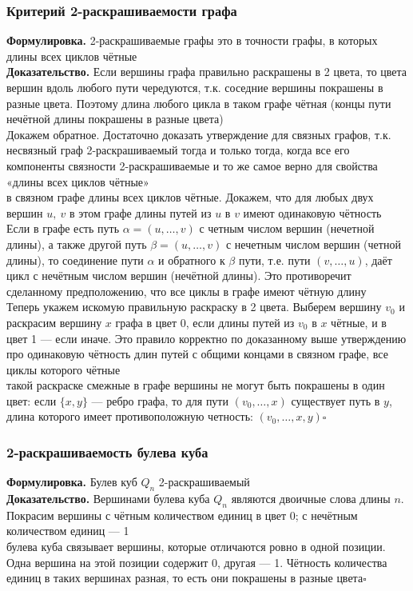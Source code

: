 \documentclass[a4paper]{article}
\begin{document}
\subsubsection*{Критерий 2-раскрашиваемости графа}
\textbf{Формулировка.} 2-раскрашиваемые графы это в точности графы, в которых длины всех циклов чётные\\[2mm]
\indent\textbf{Доказательство.} Если вершины графа правильно раскрашены в 2 цвета, то цвета вершин вдоль любого пути чередуются, т.к. соседние вершины покрашены в разные цвета. Поэтому длина любого цикла в таком графе чётная (концы пути нечётной длины покрашены в разные цвета)\\[2mm]
\indent Докажем обратное. Достаточно доказать утверждение для связных графов, т.к. несвязный граф 2-раскрашиваемый тогда и только тогда, когда все его компоненты связности 2-раскрашиваемые и то же самое верно для свойства «длины всех циклов чётные»\\[2mm]
 в связном графе длины всех циклов чётные. Докажем, что для любых двух вершин $u,\ v$ в этом графе длины путей из $u$ в $v$ имеют одинаковую чётность\\[2mm]
\indent Если в графе есть путь $\alpha=(u,\ldots,v)$ с четным числом вершин (нечетной длины), а также другой путь $\beta=(u,\ldots,v)$ с нечетным числом вершин (четной длины), то соединение пути $\alpha$ и обратного к $\beta$ пути, т.е. пути $(v,\ldots,u)$, даёт цикл с нечётным числом вершин (нечётной длины). Это противоречит сделанному предположению, что все циклы в графе имеют чётную длину\\[2mm]
\indent Теперь укажем искомую правильную раскраску в 2 цвета. Выберем вершину $v_0$ и раскрасим вершину $x$ графа в цвет 0, если длины путей из $v_0$ в $x$ чётные, и в цвет 1 — если иначе. Это правило корректно по доказанному выше утверждению про одинаковую чётность длин путей с общими концами в связном графе, все циклы которого чётные\\[2mm]
 такой раскраске смежные в графе вершины не могут быть покрашены в один цвет:  если $\{x,y\}$ — ребро графа, то для пути $(v_0,\ldots,x)$ существует путь в $y$, длина которого имеет противоположную четность: $(v_0,\ldots,x,y)$\hfill$\square$

\subsubsection*{2-раскрашиваемость булева куба}
\textbf{Формулировка.} Булев куб $Q_n$ 2-раскрашиваемый\\[2mm]
\indent\textbf{Доказательство.} Вершинами булева куба $Q_n$ являются двоичные слова длины $n$. Покрасим вершины с чётным количеством единиц в цвет 0; с нечётным количеством единиц — 1\\[2mm]
 булева куба связывает вершины, которые отличаются ровно в одной позиции. Одна вершина на этой позиции содержит 0, другая — 1. Чётность количества единиц в таких вершинах разная, то есть они покрашены в разные цвета\hfill$\square$
\end{document}
